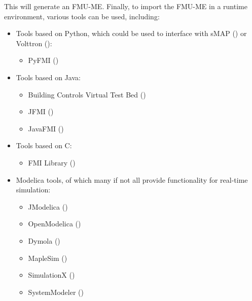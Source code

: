 \documentclass[letterpaper,10pt, openany,english]{sphinxmanual}
\begin{document}
This will generate an FMU-ME.
Finally, to import the FMU-ME in a runtime environment, various tools can be used, including:
\begin{itemize}
\item {} 
Tools based on Python, which could be used to interface with
sMAP () or
Volttron ():
\begin{itemize}
\item {} 
PyFMI ()

\end{itemize}

\item {} 
Tools based on Java:
\begin{itemize}
\item {} 
Building Controls Virtual Test Bed ()

\item {} 
JFMI ()

\item {} 
JavaFMI ()

\end{itemize}

\item {} 
Tools based on C:
\begin{itemize}
\item {} 
FMI Library ()

\end{itemize}

\item {} 
Modelica tools, of which many if not all provide
functionality for real-time simulation:
\begin{itemize}
\item {} 
JModelica ()

\item {} 
OpenModelica ()

\item {} 
Dymola ()

\item {} 
MapleSim ()

\item {} 
SimulationX ()

\item {} 
SystemModeler ()

\end{itemize}

\end{itemize}
\end{document}
